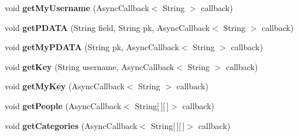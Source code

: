 \begin{DoxyCompactItemize}
\item 
\hypertarget{interfaceballmerpeak_1_1turtlenet_1_1client_1_1TurtlenetAsync_a07b7f0d56105f4fc945a854a9a316e1e}{void {\bfseries get\-My\-Username} (Async\-Callback$<$ String $>$ callback)}\label{interfaceballmerpeak_1_1turtlenet_1_1client_1_1TurtlenetAsync_a07b7f0d56105f4fc945a854a9a316e1e}

\item 
\hypertarget{interfaceballmerpeak_1_1turtlenet_1_1client_1_1TurtlenetAsync_a2c1ffad266ffba1ced9024011b85ef80}{void {\bfseries get\-P\-D\-A\-T\-A} (String field, String pk, Async\-Callback$<$ String $>$ callback)}\label{interfaceballmerpeak_1_1turtlenet_1_1client_1_1TurtlenetAsync_a2c1ffad266ffba1ced9024011b85ef80}

\item 
\hypertarget{interfaceballmerpeak_1_1turtlenet_1_1client_1_1TurtlenetAsync_acdbee21a3c9f37b2454fa81c6f81afe7}{void {\bfseries get\-My\-P\-D\-A\-T\-A} (String pk, Async\-Callback$<$ String $>$ callback)}\label{interfaceballmerpeak_1_1turtlenet_1_1client_1_1TurtlenetAsync_acdbee21a3c9f37b2454fa81c6f81afe7}

\item 
\hypertarget{interfaceballmerpeak_1_1turtlenet_1_1client_1_1TurtlenetAsync_a24536111eeed3b221288938fe085fc4d}{void {\bfseries get\-Key} (String username, Async\-Callback$<$ String $>$ callback)}\label{interfaceballmerpeak_1_1turtlenet_1_1client_1_1TurtlenetAsync_a24536111eeed3b221288938fe085fc4d}

\item 
\hypertarget{interfaceballmerpeak_1_1turtlenet_1_1client_1_1TurtlenetAsync_a5b01546855375c628581de60cb818bc1}{void {\bfseries get\-My\-Key} (Async\-Callback$<$ String $>$ callback)}\label{interfaceballmerpeak_1_1turtlenet_1_1client_1_1TurtlenetAsync_a5b01546855375c628581de60cb818bc1}

\item 
\hypertarget{interfaceballmerpeak_1_1turtlenet_1_1client_1_1TurtlenetAsync_adb97f522403e5578f780b08e96e8f36b}{void {\bfseries get\-People} (Async\-Callback$<$ String\mbox{[}$\,$\mbox{]}\mbox{[}$\,$\mbox{]}$>$ callback)}\label{interfaceballmerpeak_1_1turtlenet_1_1client_1_1TurtlenetAsync_adb97f522403e5578f780b08e96e8f36b}

\item 
\hypertarget{interfaceballmerpeak_1_1turtlenet_1_1client_1_1TurtlenetAsync_aaefb47d63b1bda3ce692fda9d4ff3b95}{void {\bfseries get\-Categories} (Async\-Callback$<$ String\mbox{[}$\,$\mbox{]}\mbox{[}$\,$\mbox{]}$>$ callback)}\label{interfaceballmerpeak_1_1turtlenet_1_1client_1_1TurtlenetAsync_aaefb47d63b1bda3ce692fda9d4ff3b95}


\end{DoxyCompactItemize}
